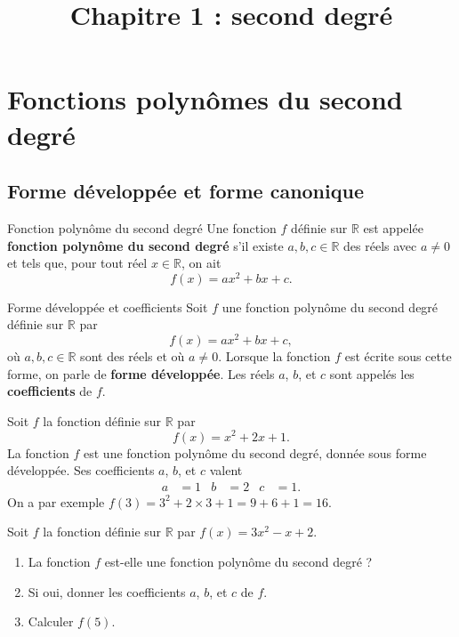 \documentclass[11pt]{article}
\title{Chapitre 1 : second degré}
\date{}
\author{}
\begin{document}
\maketitle\thispagestyle{fancy}

\section{Fonctions polynômes du second degré}
\subsection{Forme développée et forme canonique}
\begin{defi}{Fonction polynôme du second degré}
  Une fonction $f$ définie sur $\mathbb{R}$ est appelée \textbf{fonction polynôme
  du second degré} s'il existe $a, b, c\in\mathbb{R}$ des réels avec $a\neq0$ et
  tels que, pour tout réel $x\in\mathbb{R}$, on ait
  \[
    f(x) = ax^2+bx+c.
  \]
\end{defi}

\begin{defi}{Forme développée et coefficients}
  Soit $f$ une fonction polynôme du second degré définie sur $\mathbb{R}$ par
  \[
    f(x) = ax^2+bx+c,
  \]
  où $a,b,c\in\mathbb{R}$ sont des réels et où $a\neq0$. Lorsque la fonction $f$
  est écrite sous cette forme, on parle de \textbf{forme développée}. Les réels
  $a$, $b$, et $c$ sont appelés les \textbf{coefficients} de $f$.
\end{defi}

\begin{exemple}
  Soit $f$ la fonction définie sur $\mathbb{R}$ par
  \[
    f(x) = x^2+2x+1.
  \]
  La fonction $f$ est une fonction polynôme du second degré, donnée sous forme
  développée. Ses coefficients $a$, $b$, et $c$ valent
  \begin{align*}
    a &= 1 &
    b &= 2 &
    c &= 1.
  \end{align*}
  On a par exemple $f(3) = 3^2+2\times3+1=9+6+1=16$.
\end{exemple}

\begin{app}
  Soit $f$ la fonction définie sur $\mathbb{R}$ par $f(x) = 3x^2-x+2$.
  \begin{enumerate}
    \item La fonction $f$ est-elle une fonction polynôme du second degré ?
    \item Si oui, donner les coefficients $a$, $b$, et $c$ de $f$.
    \item Calculer $f(5)$.
  \end{enumerate}
\end{app}
\end{document}
